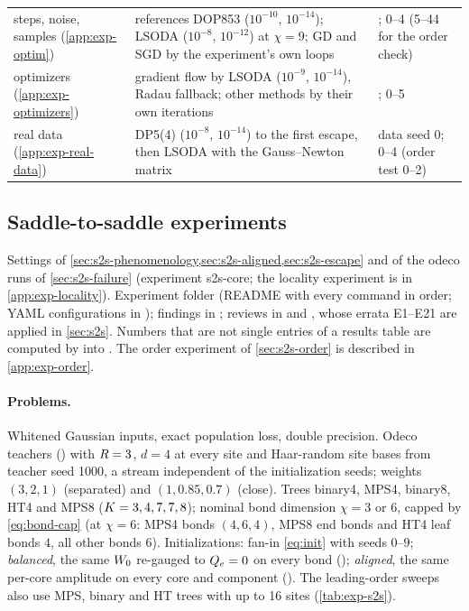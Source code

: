 \begin{table}[ht]
\begin{tabularx}{\textwidth}{@{}>{\raggedright\arraybackslash}p{2.6cm}>{\raggedright\arraybackslash}X
      >{\raggedright\arraybackslash}p{4.4cm}@{}}
    steps, noise, samples (\ref{app:exp-optim}) & references DOP853 ($10^{-10}$, $10^{-14}$); LSODA
      ($10^{-8}$, $10^{-12}$) at $\chi=9$; GD and SGD by the experiment's own loops & 101; 0--4 (5--44 for the
      order check) \\
    optimizers (\ref{app:exp-optimizers}) & gradient flow by LSODA ($10^{-9}$, $10^{-14}$), Radau fallback;
      other methods by their own iterations & 100; 0--5 \\
    real data (\ref{app:exp-real-data}) & DP5(4) ($10^{-8}$, $10^{-14}$) to the first escape, then LSODA
      with the Gauss--Newton matrix & data seed 0; 0--4 (order test 0--2) \\
    \bottomrule
  \end{tabularx}
\end{table}

\subsection{Saddle-to-saddle experiments}\label{app:exp-s2s}
Settings of \cref{sec:s2s-phenomenology,sec:s2s-aligned,sec:s2s-escape} and of the odeco runs of
\cref{sec:s2s-failure} (experiment s2s-core; the locality experiment is in \cref{app:exp-locality}).
Experiment folder  (README with every command in order; YAML configurations
in ); findings in ; reviews in 
and , whose errata E1--E21 are applied in \cref{sec:s2s}.
Numbers that are not single entries of a results table are computed by  into
.
The order experiment of \cref{sec:s2s-order} is described in \cref{app:exp-order}.

\paragraph{Problems.}
Whitened Gaussian inputs, exact population loss, double precision. Odeco teachers
() with $R=3$, $d=4$ at every site and Haar-random site bases from
teacher seed 1000, a stream independent of the initialization seeds; weights $(3,2,1)$ (separated) and
$(1,0.85,0.7)$ (close). Trees binary4, MPS4, binary8, HT4 and MPS8 ($K=3,4,7,7,8$); nominal bond
dimension $\chi=3$ or $6$, capped by \eqref{eq:bond-cap} (at $\chi=6$: MPS4 bonds $(4,6,4)$, MPS8 end bonds
and HT4 leaf bonds $4$, all other bonds $6$). Initializations: fan-in \eqref{eq:init} with seeds $0$--$9$;
\emph{balanced}, the same $W_{0}$ re-gauged to $Q_{e}=0$ on every bond (); \emph{aligned},
the same per-core amplitude on every core and component (). The
leading-order sweeps also use MPS, binary and HT trees with up to 16 sites (\cref{tab:exp-s2s}).

